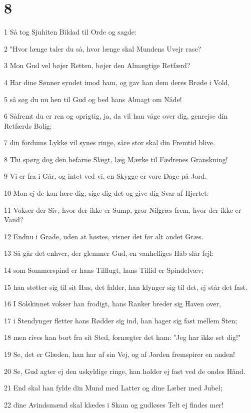 \chapter{8}

\par 1 Så tog Sjuhiten Bildad til Orde og sagde:
\par 2 "Hvor længe taler du så, hvor længe skal Mundens Uvejr rase?
\par 3 Mon Gud vel bøjer Retten, bøjer den Almægtige Retfærd?
\par 4 Har dine Sønner syndet imod ham, og gav han dem deres Brøde i Vold,
\par 5 så søg du nu hen til Gud og bed hans Almagt om Nåde!
\par 6 Såfremt du er ren og oprigtig, ja, da vil han våge over dig, genrejse din Retfærds Bolig;
\par 7 din fordums Lykke vil synes ringe, såre stor skal din Fremtid blive.
\par 8 Thi spørg dog den befarne Slægt, læg Mærke til Fædrenes Granskning!
\par 9 Vi er fra i Går, og intet ved vi, en Skygge er vore Dage på Jord.
\par 10 Mon ej de kan lære dig, sige dig det og give dig Svar af Hjertet:
\par 11 Vokser der Siv, hvor der ikke er Sump, gror Nilgræs frem, hvor der ikke er Vand?
\par 12 Endnu i Grøde, uden at høstes, visner det før alt andet Græs.
\par 13 Så går det enhver, der glemmer Gud, en vanhelliges Håb slår fejl:
\par 14 som Sommerspind er hans Tilflugt, hans Tillid er Spindelvæv;
\par 15 han støtter sig til sit Hus, det falder, han klynger sig til det, ej står det fast.
\par 16 I Solskinnet vokser han frodigt, hans Ranker breder sig Haven over,
\par 17 i Stendynger fletter hans Rødder sig ind, han hager sig fast mellem Sten;
\par 18 men rives han bort fra sit Sted, fornægter det ham: "Jeg har ikke set dig!"
\par 19 Se, det er Glæden, han har af sin Vej, og af Jorden fremspirer en anden!
\par 20 Se, Gud agter ej den uskyldige ringe, han holder ej fast ved de ondes Hånd.
\par 21 End skal han fylde din Mund med Latter og dine Læber med Jubel;
\par 22 dine Avindsmænd skal klædes i Skam og gudløses Telt ej findes mer!


